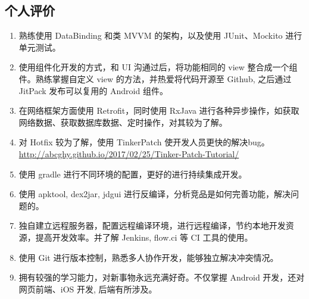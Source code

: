 \documentclass[11pt]{res}
\begin{document}
\begin{resume}
\section{个人评价}
  \begin{enumerate}
      \item 熟练使用 DataBinding 和类 MVVM 的架构，以及使用 JUnit、Mockito 进行单元测试。
      \item 使用组件化开发的方式，和 UI 沟通过后，将功能相同的 view 整合成一个组件。熟练掌握自定义 view 的方法，并热爱将代码开源至 Github, 之后通过 JitPack 发布可以复用的 Android 组件。
      \item 在网络框架方面使用 Retrofit，同时使用 RxJava 进行各种异步操作，如获取网络数据、获取数据库数据、定时操作，对其较为了解。
      \item 对 Hotfix 较为了解，使用 TinkerPatch 使开发人员更快的解决bug。\\ \url{http://abcghy.github.io/2017/02/25/Tinker-Patch-Tutorial/}
      \item 使用 gradle 进行不同环境的配置，更好的进行持续集成开发。
      \item 使用 apktool, dex2jar, jdgui 进行反编译，分析竞品是如何完善功能，解决问题的。
      \item 独自建立远程服务器，配置远程编译环境，进行远程编译，节约本地开发资源，提高开发效率。并了解 Jenkins, flow.ci 等 CI 工具的使用。
      \item 使用 Git 进行版本控制，熟悉多人协作开发，能够独立解决冲突情况。
      \item 拥有较强的学习能力，对新事物永远充满好奇。不仅掌握 Android 开发，还对网页前端、iOS 开发, 后端有所涉及。
  \end{enumerate}

\end{resume}
\end{document}

